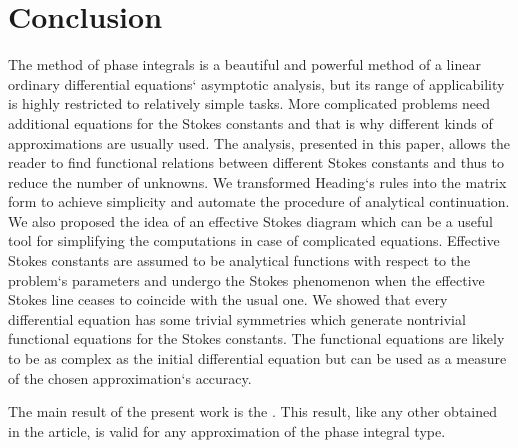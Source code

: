 \documentclass[12pt]{iopart}
\begin{document}

\section{Conclusion \label{sec:cnclsns}}

The method of phase integrals is a beautiful and powerful method of a linear ordinary 
differential equations` asymptotic analysis, but its range of applicability is highly 
restricted to relatively simple tasks. More complicated problems need additional equations 
for the Stokes constants and that is why different kinds of approximations 
\cite{white,ours} are usually used. The analysis, presented in this paper, 
allows the reader to find functional relations between different Stokes constants 
and thus to reduce the number of unknowns. We transformed Heading`s rules \cite{heading,white} 
into the matrix form to achieve simplicity and automate the procedure of analytical continuation. 
We also proposed the idea of an effective Stokes diagram which can be a useful tool 
for simplifying the computations in case of complicated equations. Effective Stokes constants 
are assumed to be analytical functions with respect to the problem`s parameters and undergo 
the Stokes phenomenon when the effective Stokes line ceases to coincide with the usual one. 
We showed that every differential equation has some trivial symmetries which generate nontrivial 
functional equations for the Stokes constants. The functional equations are likely to be as complex 
as the initial differential equation but can be used as a measure of the chosen approximation`s 
accuracy. 

The main result of the present work is the . This result, like any other obtained in 
the article, is valid for any approximation of the phase integral type.

\end{document}
